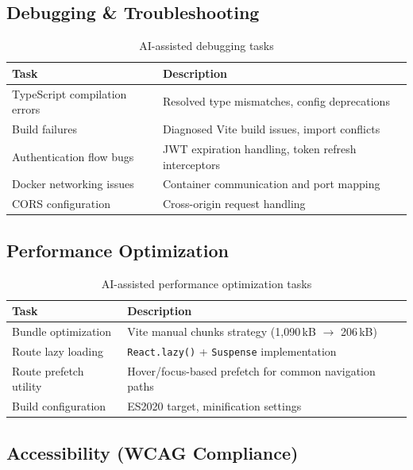 \documentclass[12pt,a4paper]{article}
\begin{document}
\subsection{Debugging \& Troubleshooting}

\begin{table}[H]
\centering
\begin{tabularx}{\textwidth}{lX}
\toprule
\textbf{Task} & \textbf{Description} \\
\midrule
TypeScript compilation errors & Resolved type mismatches, config deprecations \\
Build failures                & Diagnosed Vite build issues, import conflicts \\
Authentication flow bugs      & JWT expiration handling, token refresh interceptors \\
Docker networking issues      & Container communication and port mapping \\
CORS configuration            & Cross-origin request handling \\
\bottomrule
\end{tabularx}
\caption{AI-assisted debugging tasks}
\end{table}

\subsection{Performance Optimization}

\begin{table}[H]
\centering
\begin{tabularx}{\textwidth}{lX}
\toprule
\textbf{Task} & \textbf{Description} \\
\midrule
Bundle optimization    & Vite manual chunks strategy (1,090\,kB $\rightarrow$ 206\,kB) \\
Route lazy loading     & \texttt{React.lazy()} + \texttt{Suspense} implementation \\
Route prefetch utility & Hover/focus-based prefetch for common navigation paths \\
Build configuration    & ES2020 target, minification settings \\
\bottomrule
\end{tabularx}
\caption{AI-assisted performance optimization tasks}
\end{table}

\subsection{Accessibility (WCAG Compliance)}
\end{document}
